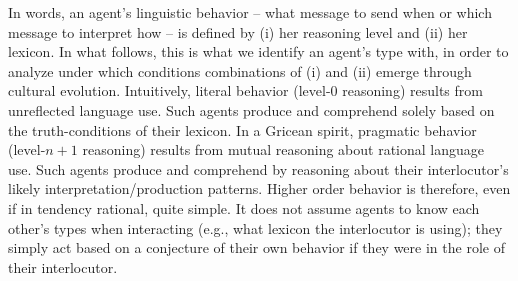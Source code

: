 \documentclass[a4paper, 11pt]{article}
\theoremstyle{Satz}
\begin{document}
In words, an agent's linguistic behavior -- what message to send when or which message to interpret how -- is defined by (i) her reasoning level and (ii) her lexicon. In what follows, this is what we identify an agent's type with, in order to analyze under which conditions combinations of (i) and (ii) emerge through cultural evolution. Intuitively, literal behavior (level-$0$ reasoning) results from unreflected language use. Such agents produce and comprehend solely based on the truth-conditions of their lexicon. In a Gricean spirit, pragmatic behavior (level-$n+1$ reasoning) results from mutual reasoning about rational language use. Such agents produce and comprehend by reasoning about their interlocutor's likely interpretation/production patterns. Higher order behavior is therefore, even if in tendency rational, quite simple. It does not assume agents to know each other's types when interacting (e.g., what lexicon the interlocutor is using); they simply act based on a conjecture of their own behavior if they were in the role of their interlocutor. 
\end{document}
